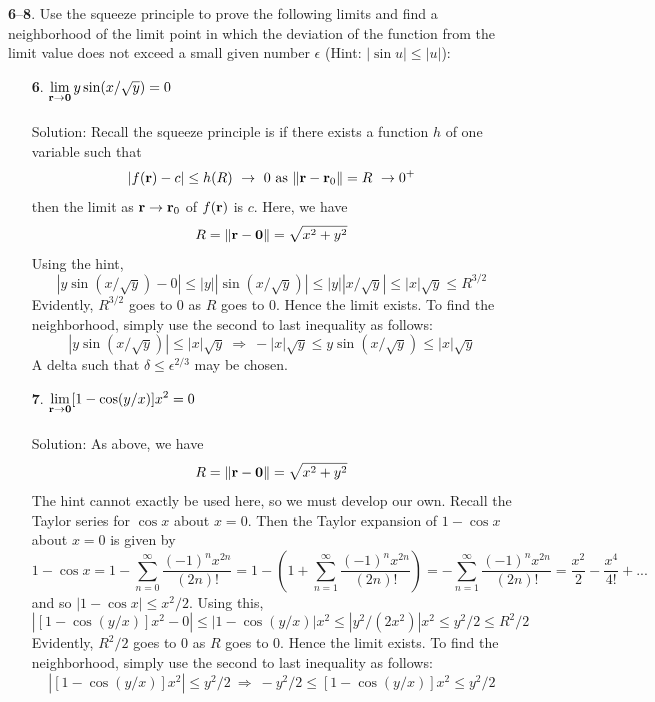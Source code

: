 \documentclass[12pt]{amsbook}
\begin{document}
\noindent
{\small {\bf 6}--{\bf 8}}. Use the squeeze principle to prove the following limits and find a
neighborhood of the limit point in which the deviation of the function from
the limit value does not exceed a small given number $\epsilon$ (Hint: $|\sin u| \leq |u|$):
\begin{enumerate}
  \item[{\small\bf 6}.] $\! \begin{aligned}[t]
 \lim_{{\bf r} \rightarrow {\bf 0}} y\sin(x/\sqrt{y})=0
\end{aligned}$ 
\\
\\
{\sc Solution}: Recall the squeeze principle is
if there exists a function $h$ of one variable such that
$$|f({\bf r})-c|\leq h(R) \ \rightarrow \ 0 \ \text{as} \ \|{\bf r}-{\bf r}_0\|=R \ \rightarrow 0^+ $$
then the limit as ${\bf r} \rightarrow {\bf r}_0$ of $f({\bf r})$ is $c$. Here, we have
$$R=\|{\bf r}-{\bf 0}\|=\sqrt{x^2+y^2}$$
Using the hint,
$$|y\sin(x/\sqrt{y})-0|\leq |y||\sin(x/\sqrt{y})| \leq |y||x/\sqrt{y}| \leq |x|\sqrt{y} \leq R^{3/2}$$
Evidently, $R^{3/2}$ goes to $0$ as $R$ goes to $0$. Hence the limit exists. To find the neighborhood, simply use the second to last inequality as follows:
$$|y\sin(x/\sqrt{y})|\leq |x|\sqrt{y} \ \Rightarrow \ -|x|\sqrt{y}\leq y\sin(x/\sqrt{y}) \leq |x|\sqrt{y}$$
A delta such that $\delta \leq \epsilon^{2/3}$ may be chosen.
\\
\item[{\small\bf 7}.] $\! \begin{aligned}[t]
\lim_{{\bf r} \rightarrow {\bf 0}}[1-\cos(y/x)]x^2=0
\end{aligned}$ 
\\
\\
{\sc Solution}: As above, we have
$$R=\|{\bf r}-{\bf 0}\|=\sqrt{x^2+y^2}$$
The hint cannot exactly be used here, so we must develop our own. Recall the Taylor series for $\cos x$ about $x=0$. Then the Taylor expansion of $1-\cos x$ about $x=0$ is given by
$$1-\cos x = 1-\sum_{n=0}^{\infty}\frac{(-1)^nx^{2n}}{(2n)!}=1-(1+\sum_{n=1}^{\infty}\frac{(-1)^nx^{2n}}{(2n)!})=-\sum_{n=1}^{\infty}\frac{(-1)^nx^{2n}}{(2n)!}=\frac{x^2}{2}-\frac{x^4}{4!}+...$$
and so $|1-\cos x|\leq x^2/2$. Using this,
$$|[1-\cos(y/x)]x^2-0|\leq |1-\cos(y/x)|x^2 \leq |y^2/(2x^2)|x^2 \leq y^2/2 \leq R^2/2$$
Evidently, $R^2/2$ goes to $0$ as $R$ goes to $0$. Hence the limit exists. To find the neighborhood, simply use the second to last inequality as follows:
$$|[1-\cos(y/x)]x^2|\leq y^2/2 \ \Rightarrow \ -y^2/2 \leq [1-\cos(y/x)]x^2 \leq y^2/2$$

\end{enumerate}
\end{document}

